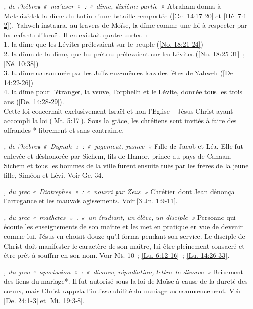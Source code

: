 \begin{multicols}{2}
\textit{, de l'hébreu «~ma'aser~»~: «~dîme, dixième partie~»}\newline
Abraham donna à Melchisédek la dîme du butin d'une bataille remportée (\vref{Ge. 14:17-20} et \vref{Hé. 7:1-2}). Yahweh instaura, au travers de Moïse, la dîme comme une loi à respecter par les enfants d'Israël. Il en existait quatre sortes~:
\\1. la dîme que les Lévites prélevaient sur le peuple (\vref{No. 18:21-24})
\\2. la dîme de la dîme, que les prêtres prélevaient sur les Lévites (\vref{No. 18:25-31}~; \vref{Né. 10:38})
\\3. la dîme consommée par les Juifs eux-mêmes lors des fêtes de Yahweh (\vref{De. 14:22-26})
\\4. la dîme pour l'étranger, la veuve, l'orphelin et le Lévite, donnée tous les trois ans (\vref{De. 14:28-29}).
\\Cette loi concernait exclusivement Israël et non l'Eglise – Jésus-Christ ayant accompli la loi (\vref{Mt. 5:17}). Sous la grâce, les chrétiens sont invités à faire des offrandes * librement et sans contrainte.

\textit{, de l'hébreu «~Diynah~»~: «~jugement, justice~»}\newline
Fille de Jacob et Léa. Elle fut enlevée et déshonorée par Sichem, fils de Hamor, prince du pays de Canaan. Sichem et tous les hommes de la ville furent ensuite tués par les frères de la jeune fille, Siméon et Lévi. Voir Ge. 34.

\textit{, du grec «~Diotrephes~»~: «~nourri par Zeus~»}\newline
Chrétien dont Jean dénonça l'arrogance et les mauvais agissements. Voir \vref{3 Jn. 1:9-11}.

\textit{, du grec «~mathetes~»~: «~un étudiant, un élève, un disciple~»}\newline
Personne qui écoute les enseignements de son maître et les met en pratique en vue de devenir comme lui. Jésus en choisit douze qu'il forma pendant son service. Le disciple de Christ doit manifester le caractère de son maître, lui être pleinement consacré et être prêt à souffrir en son nom. Voir Mt. 10~; \vref{Lu. 6:12-16}~; \vref{Lu. 14:26-33}.

\textit{, du grec «~apostasion~»~: «~divorce, répudiation, lettre de divorce~»}\newline
Brisement des liens du mariage*. Il fut autorisé sous la loi de Moïse à cause de la dureté des cœurs, mais Christ rappela l'indissolubilité du mariage au commencement. Voir \vref{De. 24:1-3} et \vref{Mt. 19:3-8}.


\end{multicols}
